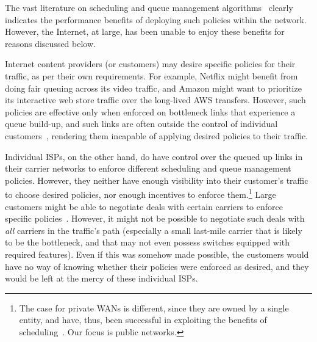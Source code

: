 
The vast literature on scheduling and queue management algorithms~\cite{diffserv, fair-queueing, sfq, pie, CoDel, fifoplus, virtualClocks, csfq, drr, red, ecn} clearly indicates the performance benefits of deploying such policies within the network. However, the Internet, at large, has been unable to enjoy these benefits for reasons discussed below. 

Internet content providers (or customers) may desire specific policies for their traffic, as per their own requirements. For example, Netflix might benefit from doing fair queuing across its video traffic, and Amazon might want to prioritize its interactive web store traffic over the long-lived AWS transfers. However, such policies are effective only when enforced on bottleneck links that experience a queue build-up, and such links are often outside the control of individual customers~\cite{inferring-interdomain-congestion}, rendering them incapable of applying desired policies to their traffic. 

Individual ISPs, on the other hand, do have control over the queued up links in their carrier networks to enforce different scheduling and queue management policies. However, they neither have enough visibility into their customer's traffic to choose desired policies, nor enough incentives to enforce them.\footnote{The case for private WANs is different, since they are owned by a single entity, and have, thus, been successful in exploiting the benefits of scheduling~\cite{swan, b4, bwe}. Our focus is public networks.} Large customers might be able to negotiate deals with certain carriers to enforce specific policies~\cite{att-qos}. However, it might not be possible to negotiate such deals with \emph{all} carriers in the traffic's path (especially a small last-mile carrier that is likely to be the bottleneck, and that may not even possess switches equipped with required features). Even if this was somehow made possible, the customers would have no way of knowing whether their policies were enforced as desired, and they would be left at the mercy of these individual ISPs.

